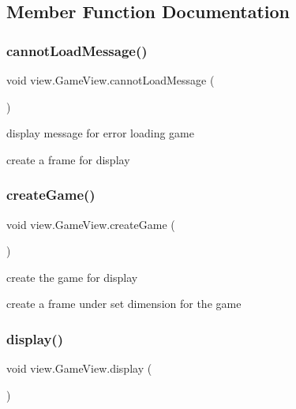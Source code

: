 \subsection{Member Function Documentation}
\hypertarget{classview_1_1_game_view_aba828f9bc44d416b7b7c03f71a927dbb}{}\label{classview_1_1_game_view_aba828f9bc44d416b7b7c03f71a927dbb} 
\subsubsection{\texorpdfstring{cannot\+Load\+Message()}{cannotLoadMessage()}}
{\footnotesize\ttfamily void view.\+Game\+View.\+cannot\+Load\+Message (\begin{DoxyParamCaption}{ }\end{DoxyParamCaption})}



display message for error loading game 

create a frame for display \hypertarget{classview_1_1_game_view_aabb001fdf15e7c066c9dbc588f720cd6}{}\label{classview_1_1_game_view_aabb001fdf15e7c066c9dbc588f720cd6} 
\subsubsection{\texorpdfstring{create\+Game()}{createGame()}}
{\footnotesize\ttfamily void view.\+Game\+View.\+create\+Game (\begin{DoxyParamCaption}{ }\end{DoxyParamCaption})}



create the game for display 

create a frame under set dimension for the game \hypertarget{classview_1_1_game_view_a47f32011f21917818ac92ebecba5dc5b}{}\label{classview_1_1_game_view_a47f32011f21917818ac92ebecba5dc5b} 
\subsubsection{\texorpdfstring{display()}{display()}}
{\footnotesize\ttfamily void view.\+Game\+View.\+display (\begin{DoxyParamCaption}{ }\end{DoxyParamCaption})}



